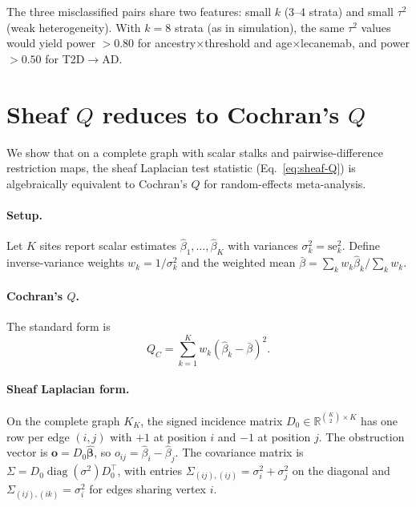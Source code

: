 \documentclass[11pt]{article}
\newcommand{\R}{\mathbb{R}}
\begin{document}
The three misclassified pairs share two features: small $k$ (3--4 strata) and small $\tau^2$ (weak heterogeneity). With $k = 8$ strata (as in simulation), the same $\tau^2$ values would yield power $> 0.80$ for ancestry$\times$threshold and age$\times$lecanemab, and power $> 0.50$ for T2D$\to$AD.

\section{Sheaf $Q$ reduces to Cochran's $Q$}
\label{app:sheaf-cochran}

We show that on a complete graph with scalar stalks and pairwise-difference restriction maps, the sheaf Laplacian test statistic (Eq.~\ref{eq:sheaf-Q}) is algebraically equivalent to Cochran's $Q$ for random-effects meta-analysis.

\paragraph{Setup.}
Let $K$ sites report scalar estimates $\hat\beta_1, \ldots, \hat\beta_K$ with variances $\sigma_k^2 = \mathrm{se}_k^2$. Define inverse-variance weights $w_k = 1/\sigma_k^2$ and the weighted mean $\bar\beta = \sum_k w_k \hat\beta_k / \sum_k w_k$.

\paragraph{Cochran's $Q$.}
The standard form is
\begin{equation}\label{eq:cochran}
    Q_C = \sum_{k=1}^{K} w_k (\hat\beta_k - \bar\beta)^2.
\end{equation}

\paragraph{Sheaf Laplacian form.}
On the complete graph $K_K$, the signed incidence matrix $D_0 \in \R^{\binom{K}{2} \times K}$ has one row per edge $(i,j)$ with $+1$ at position $i$ and $-1$ at position $j$. The obstruction vector is $\mathbf{o} = D_0 \hat{\boldsymbol{\beta}}$, so $o_{ij} = \hat\beta_i - \hat\beta_j$. The covariance matrix is $\Sigma = D_0 \operatorname{diag}(\sigma^2) D_0^\top$, with entries $\Sigma_{(ij),(ij)} = \sigma_i^2 + \sigma_j^2$ on the diagonal and $\Sigma_{(ij),(ik)} = \sigma_i^2$ for edges sharing vertex $i$.
\end{document}
